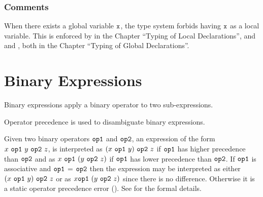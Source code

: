 \begin{mathpar}
\end{mathpar}

\subsubsection{Comments}
When there exists a global variable $\vx$, the type system
forbids having $\vx$ as a local variable.
This is enforced by  in the Chapter ``Typing of Local Declarations'',
and
 and ,
both in the Chapter ``Typing of Global Declarations''.

\hypertarget{def-binopexpressionterm}{}
\section{Binary Expressions\label{sec:BinaryExpressions}}
Binary expressions apply a binary operator to two sub-expressions.

Operator precedence is used to disambiguate binary expressions.

Given two binary operators $\opone$ and $\optwo$, an expression of the form
$x\ \opone\ y\ \optwo\ z$, is interpreted as
$(x\ \opone\ y)\ \optwo\ z$
if $\opone$ has higher precedence than $\optwo$ and as $x\ \opone\ (y\ \optwo\ z)$ if $\opone$ has lower precedence than $\optwo$.
If $\opone$ is associative and $\opone$ = $\optwo$ then the expression may be interpreted as either
$(x\ \opone\ y)\ \optwo\ z$ or as $x \opone\ (y\ \optwo\ z)$ since there is no difference.
Otherwise it is a static operator precedence error (\BinopPrecedence).
See  for the formal details.


